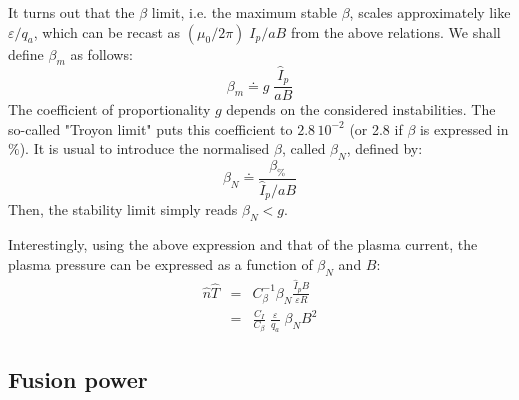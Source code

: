 It turns out that the $\beta$ limit, i.e. the maximum stable $\beta$, scales approximately like $\varepsilon/q_a$, which can be recast as $(\mu_0/2\pi)\; I_p/aB$ from the above relations. We shall define $\beta_m$ as follows:
\begin{equation}
  \beta_m \doteq g\; \frac{\hat I_p}{a B}
\end{equation}
The coefficient of proportionality $g$ depends on the considered instabilities. The so-called "Troyon limit" \cite{Troyon1984} puts this coefficient to $2.8\, 10^{-2}$ (or 2.8 if $\beta$ is expressed in $\%$).
It is usual to introduce the normalised $\beta$, called $\beta_N$, defined by:
\begin{equation}
\beta_N \doteq \frac{\beta_\%}{\hat I_p/aB}
\end{equation}
Then, the stability limit simply reads $\beta_N <g$.

Interestingly, using the above expression and that of the plasma current, the plasma pressure can be expressed as a function of $\beta_N$ and $B$:
\begin{eqnarray}
  \hat n\hat T &=& C_\beta^{-1} \beta_N \frac{\hat I_p B}{\varepsilon R} \nonumber \\
    &=& \frac{C_I}{C_\beta}\; \frac{\varepsilon}{q_a} \;  \beta_N B^2
  \label{eqn:nT_betaN}
\end{eqnarray}

\subsection{Fusion power}

